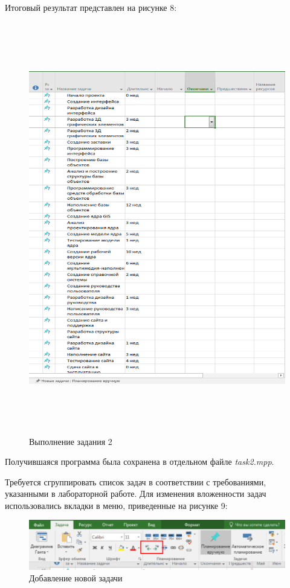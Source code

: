 \newpage

Итоговый результат представлен на рисунке 8:
\FloatBarrier
\begin{figure}[h]	
	\begin{center}
		\includegraphics[height=18cm, width=\linewidth]{inc/2-2.png}
	\end{center}
	\captionsetup{justification=centering}
	\caption{Выполнение задания 2}
\end{figure}
\FloatBarrier

Получившаяся программа была сохранена в отдельном файле \textit{task2.mpp}.

Требуется сгруппировать список задач в соответствии с требованиями, указанными в лабораторной работе.
Для изменения вложенности задач использовались вкладки в меню, приведенные на рисунке 9:
\FloatBarrier
\begin{figure}[h]	
	\begin{center}
		\includegraphics[width=\linewidth]{inc/3-3.png}
	\end{center}
	\captionsetup{justification=centering}
	\caption{Добавление новой задачи}
\end{figure}
\FloatBarrier

